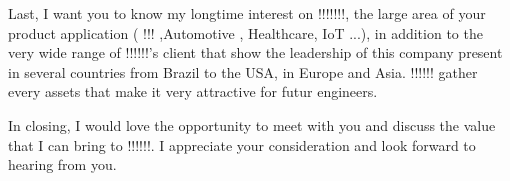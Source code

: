 \documentclass[11pt,a4paper]{moderncv}
\begin{document}
\hspace{0.8cm} Last, I want you to know my longtime interest on !!!!!!!, the large area of your product application ( !!! ,Automotive , Healthcare, IoT ...), in addition to the very wide range of !!!!!!'s client that show the leadership of this company present in several countries from Brazil to the USA, in Europe and Asia. !!!!!! gather every assets that make it very attractive for futur engineers.   


\hspace{0.8cm}In closing, I would love the opportunity to meet with you and discuss the value that I can bring to !!!!!!. I appreciate your consideration and look forward to hearing from you.



\makeletterclosing %
\end{document}
